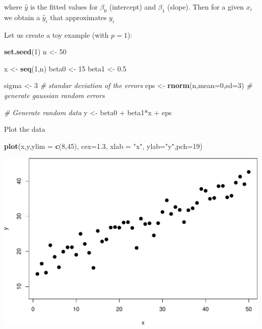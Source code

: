 \documentclass[]{article}
\newenvironment{Shaded}{\begin{snugshade}}{\end{snugshade}}
\newcommand{\KeywordTok}[1]{\textcolor[rgb]{0.13,0.29,0.53}{\textbf{{#1}}}}
\newcommand{\DataTypeTok}[1]{\textcolor[rgb]{0.13,0.29,0.53}{{#1}}}
\newcommand{\DecValTok}[1]{\textcolor[rgb]{0.00,0.00,0.81}{{#1}}}
\newcommand{\FloatTok}[1]{\textcolor[rgb]{0.00,0.00,0.81}{{#1}}}
\newcommand{\StringTok}[1]{\textcolor[rgb]{0.31,0.60,0.02}{{#1}}}
\newcommand{\CommentTok}[1]{\textcolor[rgb]{0.56,0.35,0.01}{\textit{{#1}}}}
\newcommand{\NormalTok}[1]{{#1}}
\numberwithin{equation}{section}
\begin{document}
where \(\hat y\) is the fitted values for \(\beta_0\) (intercept) and
\(\beta_1\) (slope). Then for a given \(x_i\) we obtain a \(\hat{y}_i\)
that approximates \(y_i\)

Let us create a toy example (with \(p=1\)):

\begin{Shaded}
\begin{Highlighting}[]
\KeywordTok{set.seed}\NormalTok{(}\DecValTok{1}\NormalTok{)}
\NormalTok{n <-}\StringTok{ }\DecValTok{50} 

\NormalTok{x <-}\StringTok{ }\KeywordTok{seq}\NormalTok{(}\DecValTok{1}\NormalTok{,n)}
 \NormalTok{beta0 <-}\StringTok{ }\DecValTok{15}
 \NormalTok{beta1 <-}\StringTok{ }\FloatTok{0.5}

\NormalTok{sigma <-}\StringTok{ }\DecValTok{3} \CommentTok{# standar deviation of the errors}
\NormalTok{eps <-}\StringTok{ }\KeywordTok{rnorm}\NormalTok{(n,}\DataTypeTok{mean=}\DecValTok{0}\NormalTok{,}\DataTypeTok{sd=}\DecValTok{3}\NormalTok{) }\CommentTok{# generate gaussian random errors}

\CommentTok{# Generate random data}
 \NormalTok{y <-}\StringTok{ }\NormalTok{beta0 +}\StringTok{ }\NormalTok{beta1*x  +}\StringTok{  }\NormalTok{eps}
\end{Highlighting}
\end{Shaded}

Plot the data

\begin{Shaded}
\begin{Highlighting}[]
\KeywordTok{plot}\NormalTok{(x,y,}\DataTypeTok{ylim =} \KeywordTok{c}\NormalTok{(}\DecValTok{8}\NormalTok{,}\DecValTok{45}\NormalTok{), }\DataTypeTok{cex=}\FloatTok{1.3}\NormalTok{, }\DataTypeTok{xlab =} \StringTok{"x"}\NormalTok{, }\DataTypeTok{ylab=}\StringTok{"y"}\NormalTok{,}\DataTypeTok{pch=}\DecValTok{19}\NormalTok{)}
\end{Highlighting}
\end{Shaded}

\includegraphics{index_files/figure-latex/unnamed-chunk-178-1.pdf}
\end{document}
